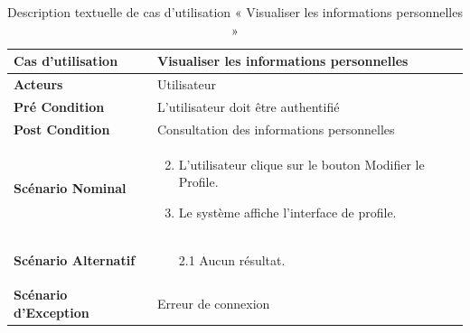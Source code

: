 \begin{longtable}{|p{5cm}|p{10cm}|}
  \caption{Description textuelle de cas d'utilisation « Visualiser les informations personnelles   »} \label{tab:use_case_view_personal_information} \\
\hline
\textbf{Cas d'utilisation}&Visualiser les informations personnelles   \\
\hline
\textbf{Acteurs}&Utilisateur\\
\hline
\textbf{Pré Condition}&L'utilisateur doit être authentifié\\
\hline
\textbf{Post Condition}&Consultation des informations personnelles \\
\hline
\textbf{Scénario Nominal}&
\vspace{-\baselineskip}
\begin{enumerate}
  \setcounter{enumi}{1}
  \item L'utilisateur clique sur le bouton Modifier le Profile.
  \item Le système affiche l'interface de profile.
\end{enumerate}\\
\hline
\textbf{Scénario Alternatif}&
\vspace{-\baselineskip}
\begin{enumerate}
 \item [2.1] Aucun résultat.
\end{enumerate}\\
\hline
\textbf{Scénario d'Exception}&
Erreur de connexion\\
\hline

\end{longtable}


